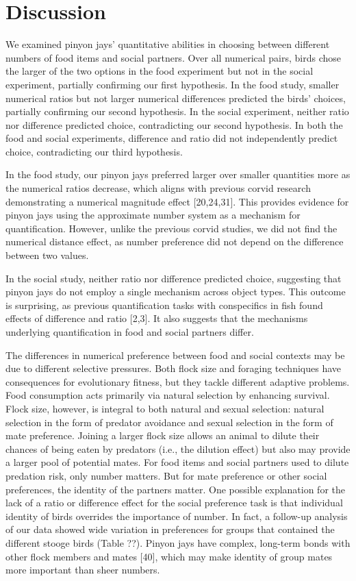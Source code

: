 \documentclass[
  ,doc,floatsintext]{apa6}
\begin{document}
\hypertarget{discussion}{%
\section{Discussion}\label{discussion}}

We examined pinyon jays' quantitative abilities in choosing between different numbers of food items and social partners. Over all numerical pairs, birds chose the larger of the two options in the food experiment but not in the social experiment, partially confirming our first hypothesis. In the food study, smaller numerical ratios but not larger numerical differences predicted the birds' choices, partially confirming our second hypothesis. In the social experiment, neither ratio nor difference predicted choice, contradicting our second hypothesis. In both the food and social experiments, difference and ratio did not independently predict choice, contradicting our third hypothesis.

In the food study, our pinyon jays preferred larger over smaller quantities more as the numerical ratios decrease, which aligns with previous corvid research demonstrating a numerical magnitude effect {[}20,24,31{]}. This provides evidence for pinyon jays using the approximate number system as a mechanism for quantification. However, unlike the previous corvid studies, we did not find the numerical distance effect, as number preference did not depend on the difference between two values.

In the social study, neither ratio nor difference predicted choice, suggesting that pinyon jays do not employ a single mechanism across object types. This outcome is surprising, as previous quantification tasks with conspecifics in fish found effects of difference and ratio {[}2,3{]}. It also suggests that the mechanisms underlying quantification in food and social partners differ.

The differences in numerical preference between food and social contexts may be due to different selective pressures. Both flock size and foraging techniques have consequences for evolutionary fitness, but they tackle different adaptive problems. Food consumption acts primarily via natural selection by enhancing survival. Flock size, however, is integral to both natural and sexual selection: natural selection in the form of predator avoidance and sexual selection in the form of mate preference. Joining a larger flock size allows an animal to dilute their chances of being eaten by predators (i.e., the dilution effect) but also may provide a larger pool of potential mates. For food items and social partners used to dilute predation risk, only number matters. But for mate preference or other social preferences, the identity of the partners matter. One possible explanation for the lack of a ratio or difference effect for the social preference task is that individual identity of birds overrides the importance of number. In fact, a follow-up analysis of our data showed wide variation in preferences for groups that contained the different stooge birds (Table ??). Pinyon jays have complex, long-term bonds with other flock members and mates {[}40{]}, which may make identity of group mates more important than sheer numbers.
\end{document}

